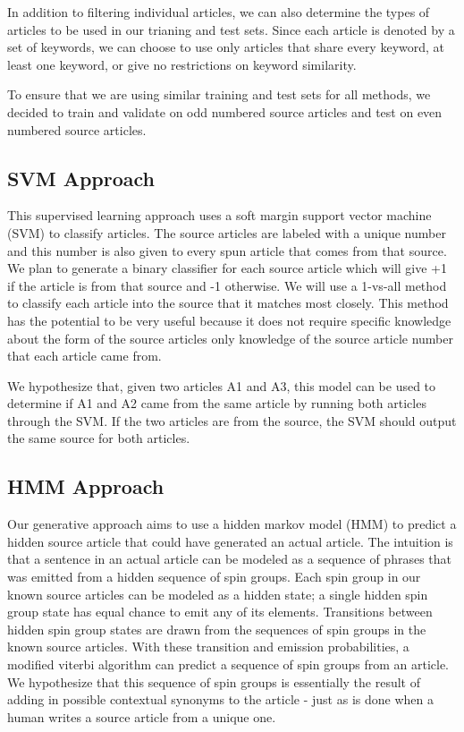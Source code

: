\documentclass[11pt,letterpaper,oneside, titlepage]{scrartcl}
\begin{document}
In addition to filtering individual articles, we can also determine the types of articles to be used in our trianing and test sets. Since each article is denoted by a set of keywords, we can choose to use only articles that share every keyword, at least one keyword, or give no restrictions on keyword similarity.

To ensure that we are using similar training and test sets for all methods, we decided to train and validate on odd numbered source articles and test on even numbered source articles.


\subsection{SVM Approach}

This supervised learning approach uses a soft margin support vector machine (SVM) to classify articles. The source articles are labeled with a unique number and this number is also given to every spun article that comes from that source. We plan to generate a binary classifier for each source article which will give +1 if the article is from that source and -1 otherwise. We will use a 1-vs-all method to classify each article into the source that it matches most closely. This method has the potential to be very useful because it does not require specific knowledge about the form of the source articles only knowledge of the source article number that each article came from.

We hypothesize that, given two articles A1 and A3, this model can be used to determine if A1 and A2 came from the same article by running both articles through the SVM. If the two articles are from the source, the SVM should output the same source for both articles.


\subsection{HMM Approach}

Our generative approach aims to use a hidden markov model (HMM) to predict a hidden source article that could have generated an actual article. The intuition is that a sentence in an actual article can be modeled as a sequence of phrases that was emitted from a hidden sequence of spin groups. Each spin group in our known source articles can be modeled as a hidden state; a single hidden spin group state has equal chance to emit any of its elements. Transitions between hidden spin group states are drawn from the sequences of spin groups in the known source articles. With these transition and emission probabilities, a modified viterbi algorithm can predict a sequence of spin groups from an article. We hypothesize that this sequence of spin groups is essentially the result of adding in possible contextual synonyms to the article - just as is done when a human writes a source article from a unique one.
\end{document}
